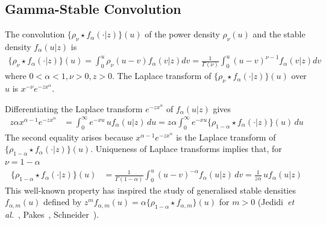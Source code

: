 \documentclass[a4paper,12pt]{article}
\begin{document}
{{\subsection{Gamma-Stable Convolution}
\label{sec:convolution}

The convolution   $\{\rho_\nu\star f_\alpha(\cdot\vert z) \}(u)$ 
of the power density $\rho_\nu(u)$ and the stable density $f_\alpha(u\vert z)$  is 
\begin{align}
\{\rho_\nu\star f_\alpha(\cdot\vert z) \}(u) =  \int_0^u \rho_\nu(u-v) f_\alpha(v\vert z) dv
=  \frac{1}{\Gamma(\nu)} \int_0^u (u-v)^{\nu-1} f_\alpha(v\vert z) dv
 \label{eq:rhoconvstable} 
\end{align}
where  $0<\alpha<1, \nu>0, z>0$.
The Laplace transform of $\{\rho_\nu\star f_\alpha(\cdot\vert z) \}(u)$  over $u$ is  $x^{-\nu} e^{-z x^\alpha}$.

Differentiating the Laplace transform $e^{-z x^\alpha}$ of  $f_\alpha(u \vert z)$ gives
\begin{align}
z\alpha x^{\alpha-1} e^{-z x^\alpha} &= %
\int_0^\infty e^{-x u} \, u f_\alpha(u \vert z)\, du
= z\alpha \int_0^\infty e^{-x u} \{\rho_{1-\alpha}\star f_\alpha(\cdot\vert z)\}(u)\, du
\label{eq:stableLTderiv}
\end{align}
The second equality arises because   $x^{\alpha-1} e^{-z x^\alpha}$ is the Laplace transform of  %
$\{\rho_{1-\alpha}\star f_\alpha(\cdot\vert z)\}(u)$.  %
Uniqueness of Laplace transforms  implies that,  %
for $\nu=1-\alpha$
\begin{align}
 \{\rho_{1-\alpha}\star f_\alpha(\cdot\vert z)\}(u) 
&= \frac{1}{\Gamma(1-\alpha)} \int_0^u (u-v)^{-\alpha} f_\alpha(u \vert z) \, dv
  =\frac{1}{ z\alpha}\,  u f_\alpha(u \vert z) 
\label{eq:stableLTderivdensity} 
\end{align}
This  well-known property  has inspired the study of generalised stable densities $f_{\alpha,m}(u)$ 
defined by  $z^m f_{\alpha,m}(u) = \alpha\{\rho_{1-\alpha}\star  f_{\alpha,m}\}(u)$ for $m>0$
(Jedidi~{\it et al.}~\cite{Jedidi},  Pakes~\cite{Pakes}, Schneider~\cite{Schneider}).

}}
\end{document}
